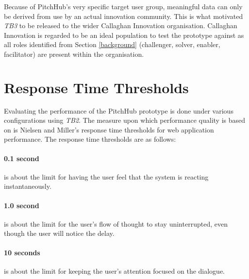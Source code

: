 Because of PitchHub's very specific target user group, meaningful data can only be derived from use by an actual innovation community. This is what motivated \textit{TB3} to be released to the wider Callaghan Innovation organisation. Callaghan Innovation is regarded to be an ideal population to test the prototype against as all roles identified from Section \ref{background} (challenger, solver, enabler, facilitator) are present within the organisation.

\section{Response Time Thresholds}\label{S:responseTimeLimits}
Evaluating the performance of the PitchHub prototype is done under various configurations using \textit{TB2}. The measure upon which performance quality is based on is Nielsen and Miller's response time thresholds \cite{Responsetime:online} for web application performance. 
The response time thresholds are as follows:
\paragraph{0.1 second} is about the limit for having the user feel that the system is reacting instantaneously.
\paragraph{1.0 second} is about the limit for the user's flow of thought to stay uninterrupted, even though the user will notice the delay.
\paragraph{10 seconds} is about the limit for keeping the user's attention focused on the dialogue.
